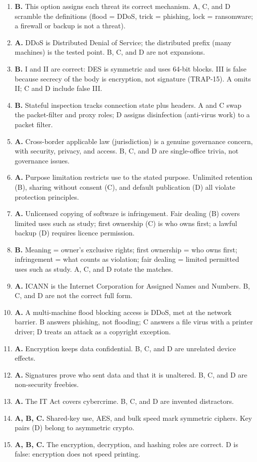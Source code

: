 \documentclass[11pt]{article}
\begin{document}
\begin{enumerate}[label=\textbf{Q\arabic*.}, leftmargin=*]
  credentials via trickery; C floods a service; D describes no concrete
  mechanism.
\item \textbf{B.} This option assigns each threat its correct mechanism. A, C,
  and D scramble the definitions (flood = DDoS, trick = phishing, lock =
  ransomware; a firewall or backup is not a threat).
\item \textbf{A.} DDoS is Distributed Denial of Service; the distributed
  prefix (many machines) is the tested point. B, C, and D are not expansions.
\item \textbf{B.} I and II are correct: DES is symmetric and uses 64-bit
  blocks. III is false because secrecy of the body is encryption, not
  signature (TRAP-15). A omits II; C and D include false III.
\item \textbf{B.} Stateful inspection tracks connection state plus headers.
  A and C swap the packet-filter and proxy roles; D assigns disinfection
  (anti-virus work) to a packet filter.
\item \textbf{A.} Cross-border applicable law (jurisdiction) is a genuine
  governance concern, with security, privacy, and access. B, C, and D are
  single-office trivia, not governance issues.
\item \textbf{A.} Purpose limitation restricts use to the stated purpose.
  Unlimited retention (B), sharing without consent (C), and default
  publication (D) all violate protection principles.
\item \textbf{A.} Unlicensed copying of software is infringement. Fair dealing
  (B) covers limited uses such as study; first ownership (C) is who owns
  first; a lawful backup (D) requires licence permission.
\item \textbf{B.} Meaning = owner's exclusive rights; first ownership = who
  owns first; infringement = what counts as violation; fair dealing = limited
  permitted uses such as study. A, C, and D rotate the matches.
\item \textbf{A.} ICANN is the Internet Corporation for Assigned Names and
  Numbers. B, C, and D are not the correct full form.
\item \textbf{A.} A multi-machine flood blocking access is DDoS, met at the
  network barrier. B answers phishing, not flooding; C answers a file virus
  with a printer driver; D treats an attack as a copyright exception.

\item \textbf{A.} Encryption keeps data confidential. B, C, and D are unrelated device effects.
\item \textbf{A.} Signatures prove who sent data and that it is unaltered. B, C, and D are non-security freebies.
\item \textbf{A.} The IT Act covers cybercrime. B, C, and D are invented distractors.
\item \textbf{A, B, C.} Shared-key use, AES, and bulk speed mark symmetric ciphers. Key pairs (D) belong to asymmetric crypto.
\item \textbf{A, B, C.} The encryption, decryption, and hashing roles are correct. D is false: encryption does not speed printing.
\end{enumerate}
\def\JKSSBLessonID{64}\def\JKSSBAnswers{1}
\end{document}
